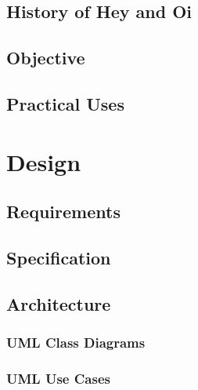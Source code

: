\documentclass[a4paper,12pt]{report}
\begin{document}
\section{History of Hey and Oi}



\section{Objective}



\section{Practical Uses}




\chapter{Design}

\section{Requirements}



\section{Specification}



\section{Architecture}



\subsection{UML Class Diagrams}



\clearpage



\clearpage

\subsection{UML Use Cases}
\end{document}

